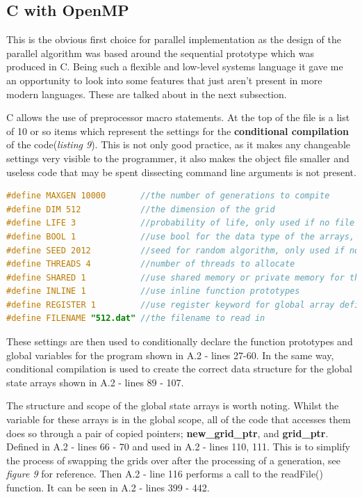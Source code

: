 \documentclass[11pt]{article} %
\begin{document}
\subsection{C with OpenMP}
This is the obvious first choice for parallel implementation as the design of the parallel algorithm was based around the sequential prototype which was produced in C. Being such a flexible and low-level systems language it gave me an opportunity to look into some features that just aren't present in more modern languages. These are talked about in the next subsection.

C allows the use of preprocessor macro statements. At the top of the file is a list of 10 or so items which represent the settings for the {\bf conditional compilation} of the code({\it listing 9}). This is not only good practice, as it makes any changeable settings very visible to the programmer, it also makes the object file smaller and useless code that may be spent dissecting command line arguments is not present. 
\begin{lstlisting}[language=C, caption={OpenMP program settings in file}]
#define MAXGEN 10000       //the number of generations to compite
#define DIM 512            //the dimension of the grid 
#define LIFE 3             //probability of life, only used if no file read
#define BOOL 1             //use bool for the data type of the arrays, else int
#define SEED 2012          //seed for random algorithm, only used if no file read
#define THREADS 4          //number of threads to allocate
#define SHARED 1           //use shared memory or private memory for threads
#define INLINE 1           //use inline function prototypes
#define REGISTER 1         //use register keyword for global array definition
#define FILENAME "512.dat" //the filename to read in
\end{lstlisting}
These settings are then used to conditionally declare the function prototypes and global variables for the program shown in A.2 - lines 27-60. In the same way, conditional compilation is used to create the correct data structure for the global state arrays shown in A.2 - lines 89 - 107.

The structure and scope of the global state arrays is worth noting. Whilst the variable for these arrays is in the global scope, all of the code that accesses them does so through a pair of copied pointers; {\bf new\_grid\_ptr}, and {\bf grid\_ptr}. Defined in A.2 - lines 66 - 70 and used in A.2 - lines 110, 111. This is to simplify the process of swapping the grids over after the processing of a generation, see {\it figure 9} for reference. Then A.2 - line 116 performs a call to the readFile() function. It can be seen in A.2 - lines 399 - 442. 
\end{document}
